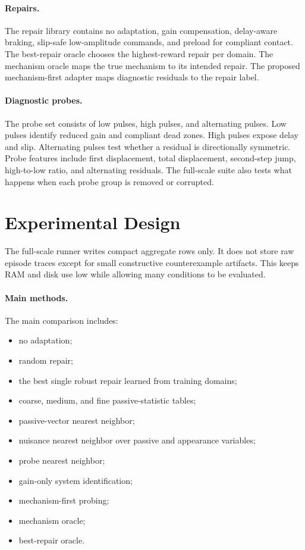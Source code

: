 \documentclass{article}
\begin{document}
\paragraph{Repairs.}
The repair library contains no adaptation, gain compensation, delay-aware
braking, slip-safe low-amplitude commands, and preload for compliant contact.
The best-repair oracle chooses the highest-reward repair per domain. The
mechanism oracle maps the true mechanism to its intended repair. The proposed
mechanism-first adapter maps diagnostic residuals to the repair label.

\paragraph{Diagnostic probes.}
The probe set consists of low pulses, high pulses, and alternating pulses. Low
pulses identify reduced gain and compliant dead zones. High pulses expose delay
and slip. Alternating pulses test whether a residual is directionally symmetric.
Probe features include first displacement, total displacement, second-step jump,
high-to-low ratio, and alternating residuals. The full-scale suite also tests
what happens when each probe group is removed or corrupted.

\section{Experimental Design}

The full-scale runner writes compact aggregate rows only. It does not store raw
episode traces except for small constructive counterexample artifacts. This keeps
RAM and disk use low while allowing many conditions to be evaluated.

\paragraph{Main methods.}
The main comparison includes:
\begin{itemize}
    \item no adaptation;
    \item random repair;
    \item the best single robust repair learned from training domains;
    \item coarse, medium, and fine passive-statistic tables;
    \item passive-vector nearest neighbor;
    \item nuisance nearest neighbor over passive and appearance variables;
    \item probe nearest neighbor;
    \item gain-only system identification;
    \item mechanism-first probing;
    \item mechanism oracle;
    \item best-repair oracle.
\end{itemize}
\end{document}

